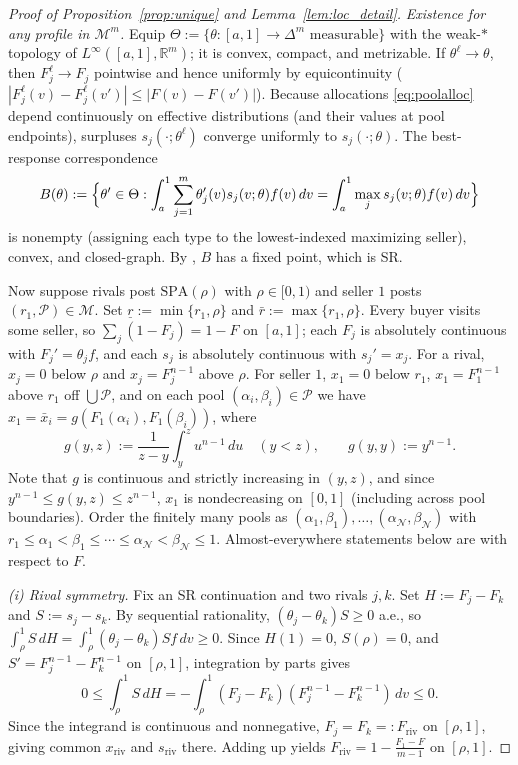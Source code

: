 \documentclass[12pt]{article}
\newcommand{\citeasnoun}[1]{\citet{#1}}
\theoremstyle{mystyle}
\theoremstyle{mystyle2}
\newcommand{\M}{\mathcal{M}}
\newcommand{\cP}{\mathcal{P}}
\newcommand{\SPA}{\mathrm{SPA}}
\newcommand{\1}{\mathbf{1}}
\renewcommand{\Re}{\mathbb{R}}
\begin{document}
\begin{proof}[Proof of Proposition~\ref{prop:unique} and Lemma~\ref{lem:loc_detail}]
\emph{Existence for any profile in $\M^m$.} Equip $\Theta:=\{\theta:[a,1]\to\Delta^m\text{ measurable}\}$ with the weak-$*$ topology of $L^\infty([a,1],\Re^m)$; it is convex, compact, and metrizable. If $\theta^\ell\to\theta$, then $F_j^\ell\to F_j$ pointwise and hence uniformly by equicontinuity ($|F_j^\ell(v)-F_j^\ell(v')|\le|F(v)-F(v')|$). Because allocations \eqref{eq:poolalloc} depend continuously on effective distributions (and their values at pool endpoints), surpluses $s_j(\cdot;\theta^\ell)$ converge uniformly to $s_j(\cdot;\theta)$. The best-response correspondence
\[
B(\theta):=\Bigl\{\theta'\in\Theta:\int_a^1\sum_{j=1}^m\theta_j'(v)s_j(v;\theta)f(v)\,dv=\int_a^1\max_{j} s_j(v;\theta)f(v)\,dv\Bigr\}
\]
is nonempty (assigning each type to the lowest-indexed maximizing seller), convex, and closed-graph. By \citeasnoun{glicksberg1952}, $B$ has a fixed point, which is SR.

Now suppose rivals post $\SPA(\rho)$ with $\rho\in[0,1)$ and seller $1$ posts $(r_1,\cP)\in\M$. Set $\underline r:=\min\{r_1,\rho\}$ and $\bar r:=\max\{r_1,\rho\}$. Every buyer visits some seller, so $\sum_j(1-F_j)=1-F$ on $[a,1]$; each $F_j$ is absolutely continuous with $F_j'=\theta_j f$, and each $s_j$ is absolutely continuous with $s_j'=x_j$. For a rival, $x_j=0$ below $\rho$ and $x_j=F_j^{n-1}$ above $\rho$. For seller $1$, $x_1=0$ below $r_1$, $x_1=F_1^{n-1}$ above $r_1$ off $\bigcup\cP$, and on each pool $(\alpha_i,\beta_i)\in\cP$ we have $x_1=\bar x_i=g(F_1(\alpha_i),F_1(\beta_i))$, where
\[
g(y,z) := \frac{1}{z-y}\int_y^z u^{n-1}\,du \quad (y<z), \qquad g(y,y):=y^{n-1}.
\]
Note that $g$ is continuous and strictly increasing in $(y,z)$, and since $y^{n-1}\le g(y,z)\le z^{n-1}$, $x_1$ is nondecreasing on $[0,1]$ (including across pool boundaries). Order the finitely many pools as $(\alpha_1,\beta_1),\dots,(\alpha_{\mathcal N},\beta_{\mathcal N})$ with $r_1\le\alpha_1<\beta_1\le\cdots\le\alpha_{\mathcal N}<\beta_{\mathcal N}\le 1$. Almost-everywhere statements below are with respect to $F$.

\emph{(i) Rival symmetry.} Fix an SR continuation and two rivals $j,k$. Set $H:=F_j-F_k$ and $S:=s_j-s_k$. By sequential rationality, $(\theta_j-\theta_k)S\ge 0$ a.e., so $\int_\rho^1 S\,dH=\int_\rho^1(\theta_j-\theta_k)Sf\,dv\ge 0$. Since $H(1)=0$, $S(\rho)=0$, and $S'=F_j^{n-1}-F_k^{n-1}$ on $[\rho,1]$, integration by parts gives
\[
0 \le \int_\rho^1 S\,dH = -\int_\rho^1 (F_j-F_k)(F_j^{n-1}-F_k^{n-1})\,dv \le 0.
\]
Since the integrand is continuous and nonnegative, $F_j=F_k=:F_{\mathrm{riv}}$ on $[\rho,1]$, giving common $x_{\mathrm{riv}}$ and $s_{\mathrm{riv}}$ there. Adding up yields $F_{\mathrm{riv}}=1-\frac{F_1-F}{m-1}$ on $[\rho,1]$.


\end{proof}
\end{document}
